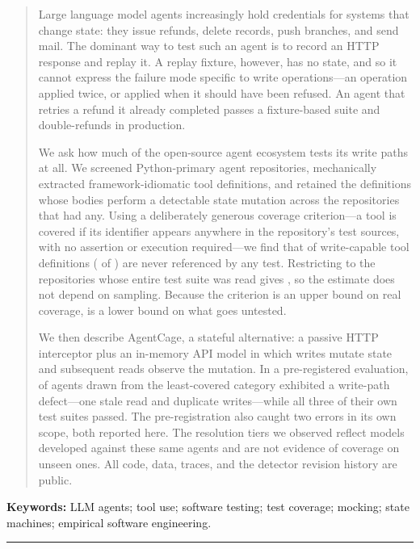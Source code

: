 \documentclass[11pt]{article}
\begin{document}
\begin{abstract}
\noindent
Large language model agents increasingly hold credentials for systems that change
state: they issue refunds, delete records, push branches, and send mail. The dominant
way to test such an agent is to record an HTTP response and replay it. A replay
fixture, however, has no state, and so it cannot express the failure mode specific to
write operations---an operation applied twice, or applied when it should have been
refused. An agent that retries a refund it already completed passes a fixture-based
suite and double-refunds in production.

We ask how much of the open-source agent ecosystem tests its write paths at all. We
screened \AcCandidates{} Python-primary agent repositories, mechanically extracted
framework-idiomatic tool definitions, and retained the \AcTools{} definitions whose
bodies perform a detectable state mutation across the \AcRepos{} repositories that had
any. Using a deliberately generous coverage criterion---a tool is covered if its
identifier appears anywhere in the repository's test sources, with no assertion or
execution required---we find that \AcUncoveredPct{} of write-capable tool definitions
(\AcUncovered{} of \AcTools{}) are never referenced by any test. Restricting to the
\AcSensRepos{} repositories whose entire test suite was read gives \AcSensPct{},
so the estimate does not depend on sampling. Because the criterion is an upper bound
on real coverage, \AcUncoveredPct{} is a lower bound on what goes untested.

We then describe AgentCage, a stateful alternative: a passive HTTP interceptor plus an
in-memory API model in which writes mutate state and subsequent reads observe the
mutation. In a pre-registered evaluation, \BbAgentsDefective{} of \BbAgentsRun{} agents
drawn from the least-covered category exhibited a write-path defect---one stale read and
\BbDuplicateWrites{} duplicate writes---while all three of their own test suites passed.
The pre-registration also caught two errors in its own scope, both reported here. The
resolution tiers we observed reflect models developed against these same agents and are
not evidence of coverage on unseen ones. All code, data, traces, and the detector
revision history are public.
\end{abstract}

\vspace{0.6em}
{\small\noindent\textbf{Keywords:} LLM agents; tool use; software testing; test coverage;
mocking; state machines; empirical software engineering.\par}
\vspace{0.4em}
{\color{AcRule}\hrule height 0.5pt}
\vspace{1.2em}
\end{document}
